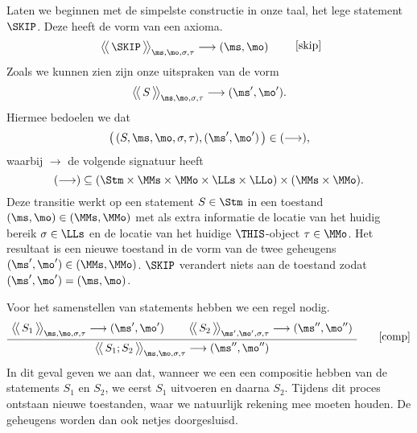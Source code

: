 Laten we beginnen met de simpelste constructie in onze taal, het lege statement $\SKIP$. Deze heeft de vorm van een axioma.
%
\begin{equation*}
  \AxiomC{$
    \Config{\SKIP}{\ms, \mo, \sigma, \tau}
    \longrightarrow
    (\ms, \mo)
  $}
  {\DisplayProof}
  \tag*{[skip]}
\end{equation*}
%
Zoals we kunnen zien zijn onze uitspraken van de vorm
%
\begin{equation*}
  \Config{S}{\ms,\mo,\sigma,\tau} \longrightarrow (\ms',\mo').
\end{equation*}
%
Hiermee bedoelen we dat
%
\begin{equation*}
  \big(\,(S,\ms,\mo,\sigma,\tau), (\ms',\mo')\,\big) \in (\longrightarrow),
\end{equation*}
%
waarbij $\longrightarrow$ de volgende signatuur heeft 
%
\begin{equation*}
  (\longrightarrow) \subseteq (\Stm \times \MMs \times \MMo \times \LLs \times \LLo) \times (\MMs \times \MMo).
\end{equation*}
%
Deze transitie werkt op een statement $S\in\Stm$ in een toestand $(\ms,\mo)\in(\MMs,\MMo)$ met als extra informatie de locatie van het huidig bereik $\sigma\in\LLs$ en de locatie van het huidige $\THIS$-object $\tau\in\MMo$. Het resultaat is een nieuwe toestand in de vorm van de twee geheugens $(\ms',\mo')\in(\MMs,\MMo)$. $\SKIP$ verandert niets aan de toestand zodat $(\ms',\mo')=(\ms,\mo)$.

Voor het samenstellen van statements hebben we een regel nodig.
%
\begin{gather*}
  \AxiomC{$
    \Config{S_1}{\ms, \mo, \sigma, \tau}
    \longrightarrow
    (\ms', \mo')
  $}
  \AxiomC{$
    \Config{S_2}{\ms', \mo', \sigma, \tau}
    \longrightarrow
    (\ms'', \mo'')
  $}
  \BinaryInfC{$
    \Config{S_1; S_2}{\ms, \mo, \sigma, \tau}
    \longrightarrow
    (\ms'', \mo'')
  $}
  {\DisplayProof}
  \tag*{[comp]}
\end{gather*}
%
In dit geval geven we aan dat, wanneer we een een compositie hebben van de statements $S_1$ en $S_2$, we eerst $S_1$ uitvoeren%
en daarna $S_2$. Tijdens dit proces ontstaan nieuwe toestanden, waar we natuurlijk rekening mee moeten houden. De geheugens worden dan ook netjes doorgesluisd.

